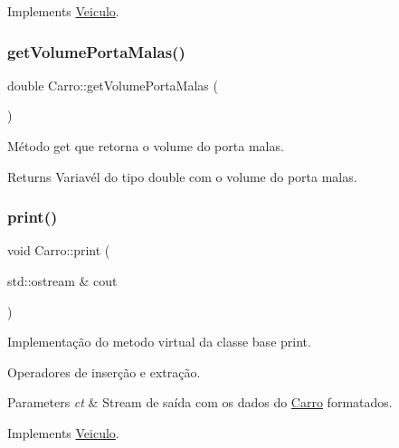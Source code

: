 Implements \hyperlink{classVeiculo}{Veiculo}.

\mbox{\label{classCarro_a9c1b5709a69b34a406f10301ab98b1c8}} 
\subsubsection{\texorpdfstring{get\+Volume\+Porta\+Malas()}{getVolumePortaMalas()}}
{\footnotesize\ttfamily double Carro\+::get\+Volume\+Porta\+Malas (\begin{DoxyParamCaption}{ }\end{DoxyParamCaption})}



Método get que retorna o volume do porta malas. 

\begin{DoxyReturn}{Returns}
Variavél do tipo double com o volume do porta malas. 
\end{DoxyReturn}
\mbox{\label{classCarro_ae358f01446ebc1cf966e233cc26ae5e2}} 
\subsubsection{\texorpdfstring{print()}{print()}}
{\footnotesize\ttfamily void Carro\+::print (\begin{DoxyParamCaption}\item[{std\+::ostream \&}]{cout }\end{DoxyParamCaption})\hspace{0.3cm}{\ttfamily [virtual]}}



Implementação do metodo virtual da classe base \textquotesingle{}print\textquotesingle{}. 

Operadores de inserção e extração.


\begin{DoxyParams}{Parameters}
{\em ct} & Stream de saída com os dados do \hyperlink{classCarro}{Carro} formatados. \\
\hline
\end{DoxyParams}


Implements \hyperlink{classVeiculo}{Veiculo}.

\mbox{\label{classCarro_a78d2b6f206ba9e33b5df2f4722434bc3}} 

